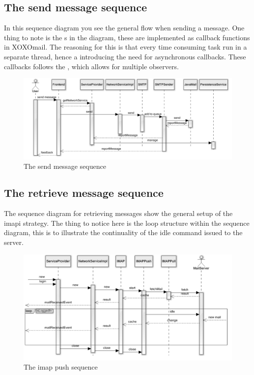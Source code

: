 \newpage
	
\subsection{The send message sequence}
	In this sequence diagram you see the general flow when sending a message. One thing to note is the s in the diagram, these are implemented as callback functions in XOXOmail. The reasoning for this is that every time consuming task run in a separate thread, hence a introducing the need for asynchronous callbacks. These callbacks follows the \cite{bib:observer}, which allows for multiple observers. 
	\begin{figure}[H]
		\includegraphics[width=\textwidth]{SendSequence}
		\caption{The send message sequence}
		\label{fig:lifecycle}
	\end{figure}

\newpage

\subsection{The retrieve message sequence}
	The sequence diagram for retrieving messages show the general setup of the \gls{imapi} strategy. The thing to notice here is the loop structure within the sequence diagram, this is to illustrate the continuality of the idle command issued to the server. 
	\begin{figure}[H]
		\includegraphics[width=\textwidth]{IMAPPushSequence}
		\caption{The imap push sequence}
		\label{fig:lifecycle}
	\end{figure}
	

